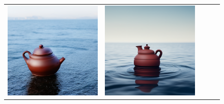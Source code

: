 \begin{figure}[!ht]
\begin{tabular}[t]{c c c c c}
    \includegraphics[width=\xwidth]{cp2/figures/dreambooth/teapot/c256_checkpoint_599.png} &
    \includegraphics[width=\xwidth]{cp2/figures/dreambooth/teapot/c320_checkpoint_99.png} &

\end{tabular}
\end{figure}
